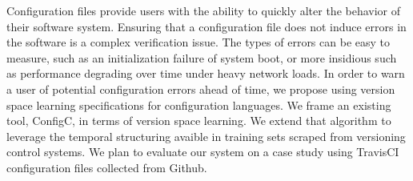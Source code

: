 Configuration files provide users with the ability to quickly alter the behavior of their software system.
Ensuring that a configuration file does not induce errors in the software is a complex verification issue.
The types of errors can be easy to measure, such as an initialization failure of system boot, 
   or more insidious such as performance degrading over time under heavy network loads.
In order to warn a user of potential configuration errors ahead of time, we propose using version space learning specifications for configuration languages.
We frame an existing tool, ConfigC, in terms of version space learning.
We extend that algorithm to leverage the temporal structuring avaible in training sets scraped from versioning control systems.
We plan to evaluate our system on a case study using TravisCI configuration files collected from Github.
 
